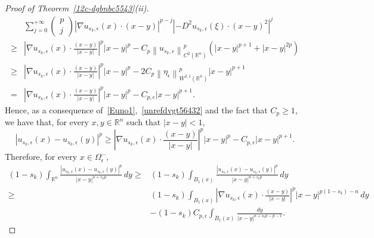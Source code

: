 \documentclass[12pt]{article}
\newcommand{\R}{\mathbb{R}}
\numberwithin{equation}{section}
\renewcommand{\geq}{\geqslant}
\begin{document}
\begin{proof}[Proof of Theorem~\ref{12c-dgbnbc5543}(ii)]
\begin{equation*}
\begin{split}
& \sum_{j=0}^{+\infty} \begin{pmatrix}p\\j \end{pmatrix}\left|\nabla u_{s_k,\epsilon} (x) \cdot(x-y)\right|^{p-j}\left|-D^2u_{s_k,\epsilon}(\xi)\cdot(x-y)^2 \right|^{j}\\
\geq & \left|\nabla u_{s_k,\epsilon} (x) \cdot\frac{(x-y)}{\left|x-y\right|}\right|^p\left|x-y\right|^p-C_{p}\left\| u_{s_k,\epsilon}\right\|_{C^2(\R^n)}^{p} \left(\left|x-y\right|^{p+1}+\left|x-y\right|^{2p}\right)\\
\geq & \left|\nabla u_{s_k,\epsilon} (x) \cdot\frac{(x-y)}{\left|x-y\right|}\right|^p\left|x-y\right|^p-2C_{p}\left\|\eta_\epsilon \right\|_{W^{2,1}(\R^n)}^p \left|x-y\right|^{p+1}\\
=&\left|\nabla u_{s_k,\epsilon} (x) \cdot\frac{(x-y)}{\left|x-y\right|}\right|^p\left|x-y\right|^p-C_{p,\epsilon} \left|x-y\right|^{p+1}.
\end{split}
\end{equation*} 
Hence, as a consequence of~\eqref{Euno1},~\eqref{unrefdvgt56432} and the fact that $C_p\geq 1$,
we have that, for every $x,y\in\R^n$ such that $\left|x-y\right|<1$,
\begin{equation*}
\left|u_{s_k,\epsilon}(x)-u_{s_k,\epsilon}(y)\right|^p\geq \left|\nabla u_{s_k,\epsilon} (x) \cdot\frac{(x-y)}{\left|x-y\right|}\right|^p\left|x-y\right|^p-C_{p,\epsilon} \left|x-y\right|^{p+1}.
\end{equation*}
Therefore, for every $x\in \Omega_{\epsilon}^{-}$,
\begin{equation*}
\begin{split}
(1-s_k)\int_{\R^n} \frac{\left|u_{s_k,\epsilon}(x)-u_{s_k,\epsilon}(y)\right|^p}{\left|x-y\right|^{n+s_k p}}\,dy \geq &  (1-s_k) \int_{B_1(x)} \frac{\left|u_{s_k,\epsilon}(x)-u_{s_k,\epsilon}(y)\right|^p}{\left|x-y\right|^{n+s_k p}}\,dy\\
\geq & (1-s_k)\int_{B_1(x)}\left|\nabla u_{s_k,\epsilon} (x) \cdot\frac{(x-y)}{\left|x-y\right|}\right|^p\left|x-y\right|^{p(1-s_k)-n}\,dy\\
&-(1-s_k)C_{p,\epsilon}\int_{B_1(x)}\frac{dy}{\left|x-y\right|^{n+s_k p-p-1}}. 
\end{split}
\end{equation*} 


\end{proof}
\end{document}
